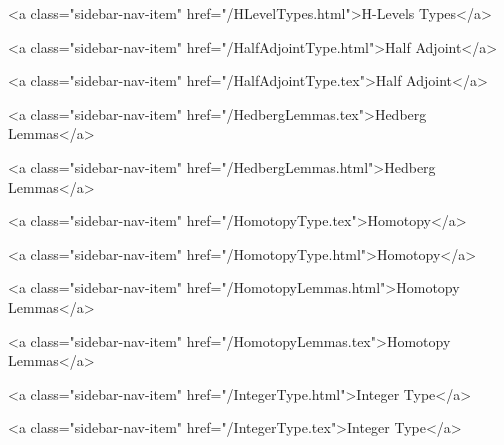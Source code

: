       
        
          <a class="sidebar-nav-item" href="/HLevelTypes.html">H-Levels Types</a>
        
      
    
      
        
          <a class="sidebar-nav-item" href="/HalfAdjointType.html">Half Adjoint</a>
        
      
    
      
        
          <a class="sidebar-nav-item" href="/HalfAdjointType.tex">Half Adjoint</a>
        
      
    
      
        
          <a class="sidebar-nav-item" href="/HedbergLemmas.tex">Hedberg Lemmas</a>
        
      
    
      
        
          <a class="sidebar-nav-item" href="/HedbergLemmas.html">Hedberg Lemmas</a>
        
      
    
      
        
          <a class="sidebar-nav-item" href="/HomotopyType.tex">Homotopy</a>
        
      
    
      
        
          <a class="sidebar-nav-item" href="/HomotopyType.html">Homotopy</a>
        
      
    
      
        
          <a class="sidebar-nav-item" href="/HomotopyLemmas.html">Homotopy Lemmas</a>
        
      
    
      
        
          <a class="sidebar-nav-item" href="/HomotopyLemmas.tex">Homotopy Lemmas</a>
        
      
    
      
        
          <a class="sidebar-nav-item" href="/IntegerType.html">Integer Type</a>
        
      
    
      
        
          <a class="sidebar-nav-item" href="/IntegerType.tex">Integer Type</a>
        
      
    
